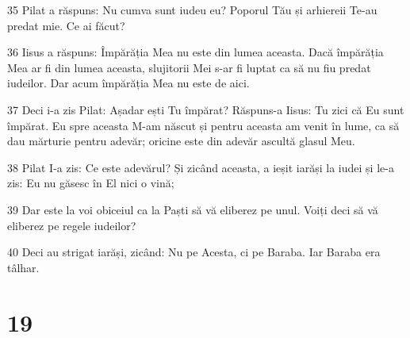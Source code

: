 \par 35 Pilat a răspuns: Nu cumva sunt iudeu eu? Poporul Tău și arhiereii Te-au predat mie. Ce ai făcut?
\par 36 Iisus a răspuns: Împărăția Mea nu este din lumea aceasta. Dacă împărăția Mea ar fi din lumea aceasta, slujitorii Mei s-ar fi luptat ca să nu fiu predat iudeilor. Dar acum împărăția Mea nu este de aici.
\par 37 Deci i-a zis Pilat: Așadar ești Tu împărat? Răspuns-a Iisus: Tu zici că Eu sunt împărat. Eu spre aceasta M-am născut și pentru aceasta am venit în lume, ca să dau mărturie pentru adevăr; oricine este din adevăr ascultă glasul Meu.
\par 38 Pilat I-a zis: Ce este adevărul? Și zicând aceasta, a ieșit iarăși la iudei și le-a zis: Eu nu găsesc în El nici o vină;
\par 39 Dar este la voi obiceiul ca la Paști să vă eliberez pe unul. Voiți deci să vă eliberez pe regele iudeilor?
\par 40 Deci au strigat iarăși, zicând: Nu pe Acesta, ci pe Baraba. Iar Baraba era tâlhar.

\chapter{19}

